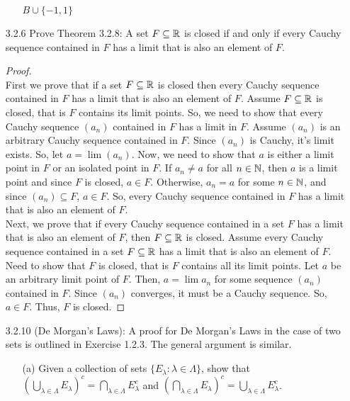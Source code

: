 \documentclass[12pt,letterpaper]{article}
\begin{document}
\begin{itemize}[leftmargin=!,labelindent=5pt]
\begin{itemize}
                    $B \cup \{-1, 1\}$
            \end{itemize}
        \item [3.2.6] Prove Theorem 3.2.8: A set $F \subseteq \mathbb{R}$ is closed if and only if every Cauchy sequence contained in $F$ has a limit that is also an element of $F$.
            \begin{proof}
                \ \\
                First we prove that if a set $F \subseteq \mathbb{R}$ is closed then every Cauchy sequence contained in $F$ has a limit that is also an element of $F$.
                Assume $F \subseteq \mathbb{R}$ is closed, that is $F$ contains its limit points.
                So, we need to show that every Cauchy sequence $(a_n)$ contained in $F$ has a limit in $F$.
                Assume $(a_n)$ is an arbitrary Cauchy sequence contained in $F$.
                Since $(a_n)$ is Cauchy, it's limit exists.
                So, let $a = \lim (a_n)$.
                Now, we need to show that $a$ is either a limit point in $F$ or an isolated point in $F$.
                If $a_n \neq a$ for all $n \in \mathbb{N}$, then $a$ is a limit point and since $F$ is closed, $a \in F$.
                Otherwise, $a_n = a$ for some $n \in \mathbb{N}$, and since $(a_n) \subseteq F$, $a \in F$.
                So, every Cauchy sequence contained in $F$ has a limit that is also an element of $F$.
                \\
                Next, we prove that if every Cauchy sequence contained in a set $F$ has a limit that is also an element of $F$, then $F \subseteq \mathbb{R}$ is closed.
                Assume every Cauchy sequence contained in a set $F \subseteq \mathbb{R}$ has a limit that is also an element of $F$.
                Need to show that $F$ is closed, that is $F$ contains all its limit points.
                Let $a$ be an arbitrary limit point of $F$.
                Then, $a = \lim a_n$ for some sequence $(a_n)$ contained in $F$.
                Since $(a_n)$ converges, it must be a Cauchy sequence.
                So, $a \in F$. Thus, $F$ is closed.
            \end{proof}
        \newpage
        \item [3.2.10] (De Morgan's Laws): A proof for De Morgan’s Laws in the case of two sets is outlined in Exercise 1.2.3. The general argument is similar.
            \begin{itemize}
                \item [(a)] Given a collection of sets $\{E_\lambda : \lambda \in \Lambda\}$, show that $(\bigcup_{\lambda \in \Lambda} E_\lambda)^c = \bigcap_{\lambda \in \Lambda} E_{\lambda}^c$ and $(\bigcap_{\lambda \in \Lambda} E_\lambda)^c = \bigcup_{\lambda \in \Lambda} E_{\lambda}^c$.

\end{itemize}
\end{itemize}
\end{document}
